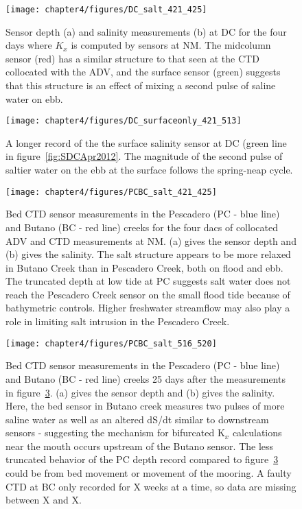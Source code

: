 



\begin{figure}
	\texttt{[image: chapter4/figures/DC\_salt\_421\_425]}
	\caption{Sensor depth (a) and salinity measurements (b) at DC for the four days where $K_x$ is computed by sensors at NM. The midcolumn sensor (red) has a similar structure to that seen at the CTD collocated with the ADV, and the surface sensor (green) suggests that this structure is an effect of mixing a second pulse of saline water on ebb.} \label{fig:SDCApr2012} \label{fig:DC_salt_421_425}
\end{figure}


\begin{figure}
	\texttt{[image: chapter4/figures/DC\_surfaceonly\_421\_513]}
	\caption{A longer record of the the surface salinity sensor at DC (green line in figure~\ref{fig:SDCApr2012}. The magnitude of the second pulse of saltier water on the ebb at the surface follows the spring-neap cycle.} \label{fig:SsurfLT}
\end{figure}


\begin{figure}
	\texttt{[image: chapter4/figures/PCBC\_salt\_421\_425]}
	\caption{Bed CTD sensor measurements in the Pescadero (PC - blue line) and Butano (BC  - red line) creeks for the four dacs of collocated ADV and CTD measurements at NM. (a) gives the sensor depth and (b) gives the salinity. The salt structure appears to be more relaxed in Butano Creek than in Pescadero Creek, both on flood and ebb. The truncated depth at low tide at PC suggests salt water does not reach the Pescadero Creek sensor on the small flood tide because of bathymetric controls. Higher freshwater streamflow may also play a role in limiting salt intrusion in the Pescadero Creek.} \label{fig:PCBC421:425}
\end{figure}



\begin{figure}
	\texttt{[image: chapter4/figures/PCBC\_salt\_516\_520]}
	\caption{Bed CTD sensor measurements in the Pescadero (PC - blue line) and Butano (BC - red line) creeks 25 days after the measurements in figure~\ref{fig:PCBC421:425}. (a) gives the sensor depth and (b) gives the salinity. Here, the bed sensor in Butano creek measures two pulses of more saline water as well as an altered dS/dt similar to downstream sensors - suggesting the mechanism for bifurcated K$_x$ calculations near the mouth occurs upstream of the Butano sensor. The less truncated behavior of the PC depth record compared to figure~\ref{fig:PCBC421:425} could be from bed movement or movement of the mooring. A faulty CTD at BC only recorded for X weeks at a time, so data are missing between X and X.}  \label{fig:PCBC511:516}
\end{figure}



